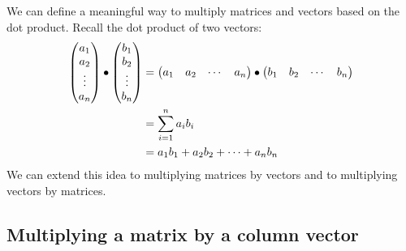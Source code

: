 \documentclass{ximera}
\begin{document}
We can define a meaningful way to multiply matrices and vectors based
on the dot product.  Recall the dot product of two vectors:
\begin{align*}
  \begin{pmatrix}
    a_1\\
    a_2\\
    \vdots\\
    a_n
  \end{pmatrix}
  \bullet
  \begin{pmatrix}
    b_1\\
    b_2\\
    \vdots\\
    b_n
  \end{pmatrix}
  &=\begin{pmatrix} a_1 & a_2 & \cdots & a_n\end{pmatrix}\bullet\begin{pmatrix} b_1 & b_2 & \cdots & b_n\end{pmatrix}\\
  &= \sum_{i=1}^n a_ib_i\\
  &= a_1b_1 + a_2b_2 +\dots+a_nb_n
\end{align*}
We can extend this idea to multiplying matrices by vectors and to
multiplying vectors by matrices.

\subsection{Multiplying a matrix by a column vector}
\end{document}
